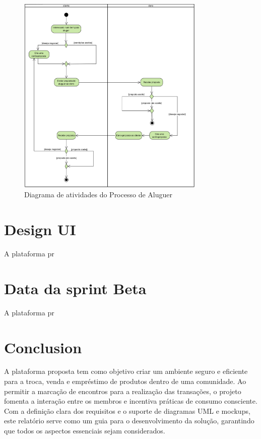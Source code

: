 \documentclass[a4paper, 12pt]{article} %
\begin{document}
\begin{figure}[ht]
	\centering
	\includegraphics[width=0.8\textwidth]{../images/activity-diagram-rentals.png}
	\caption{Diagrama de atividades do Processo de Aluguer}
	\label{fig:diagrama_atividades_aluguer}
\end{figure}

\newpage
\clearpage
\section*{Design UI}

A plataforma pr

\newpage
\section*{Data da sprint Beta}

A plataforma pr

\newpage
\section*{Conclusion}

A plataforma proposta tem como objetivo criar um ambiente seguro e eficiente para a troca, venda e empréstimo de produtos dentro de uma comunidade. Ao permitir a marcação de encontros para a realização das transações, o projeto fomenta a interação entre os membros e incentiva práticas de consumo consciente. 
Com a definição clara dos requisitos e o suporte de diagramas UML e mockups, este relatório serve como um guia para o desenvolvimento da solução, garantindo que todos os aspectos essenciais sejam considerados.







\end{document}
